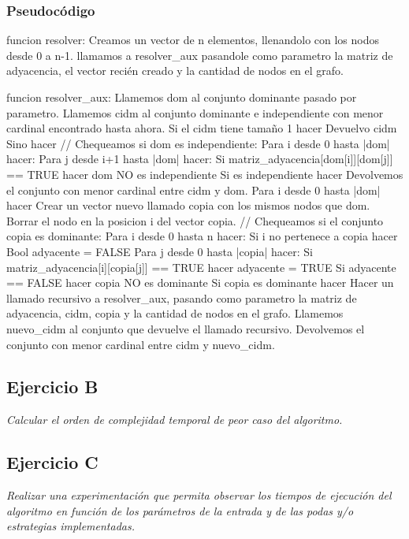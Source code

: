 \subsubsection{Pseudocódigo}
\begin{codesnippet}
funcion resolver:
    Creamos un vector de n elementos, llenandolo con los nodos desde 0 a n-1.
    llamamos a resolver_aux pasandole como parametro la matriz de adyacencia, el vector
        recién creado y la cantidad de nodos en el grafo.

funcion resolver_aux:
    Llamemos dom al conjunto dominante pasado por parametro.
    Llamemos cidm al conjunto dominante e independiente con menor cardinal encontrado
        hasta ahora.
    Si el cidm tiene tamaño 1 hacer
        Devuelvo cidm
    Sino hacer
        // Chequeamos si dom es independiente:
        Para i desde 0 hasta |dom| hacer:
            Para j desde i+1 hasta |dom| hacer:
                Si matriz_adyacencia[dom[i]][dom[j]] == TRUE hacer
                    dom NO es independiente
        Si es independiente hacer
            Devolvemos el conjunto con menor cardinal entre cidm y dom.
    Para i desde 0 hasta |dom| hacer
        Crear un vector nuevo llamado copia con los mismos nodos que dom.
        Borrar el nodo en la posicion i del vector copia.
        // Chequeamos si el conjunto copia es dominante:
        Para i desde 0 hasta n hacer:
            Si i no pertenece a copia hacer
                Bool adyacente = FALSE
                Para j desde 0 hasta |copia| hacer:
                    Si matriz_adyacencia[i][copia[j]] == TRUE hacer
                        adyacente = TRUE
                Si adyacente == FALSE hacer
                    copia NO es dominante
        Si copia es dominante hacer
            Hacer un llamado recursivo a resolver_aux, pasando como parametro la matriz
                de adyacencia, cidm, copia y la cantidad de nodos en el grafo.
            Llamemos nuevo_cidm al conjunto que devuelve el llamado recursivo.
            Devolvemos el conjunto con menor cardinal entre cidm y nuevo_cidm.
\end{codesnippet}

\subsection{Ejercicio B}

\textit{Calcular el orden de complejidad temporal de peor caso del algoritmo.}
\medskip

\subsection{Ejercicio C}

\textit{Realizar una experimentación que permita observar los tiempos de ejecución del algoritmo en función de los parámetros de la entrada y de las podas y/o estrategias implementadas.}
\medskip
